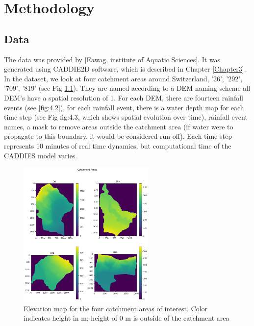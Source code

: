
\chapter{Methodology} %
\label{Chapter4} %

\section{Data}

The data was provided by [Eawag, institute of Aquatic Sciences]. It was generated using CADDIE2D software, which is described in Chapter \ref{Chapter3}. In the dataset, we look at four catchment areas around Switzerland, '26', '292', '709', '819' (see Fig \ref{fig:4.1}). They are named according to a DEM naming scheme all DEM's have a spatial resolution of 1. For each DEM, there are fourteen rainfall events (see \ref{fig:4.2}), for each rainfall event, there is a water depth  map for each time step (see Fig {fig:4.3}, which shows spatial evolution over time), rainfall event names, a mask to remove areas  outside the catchment area (if water were to propagate to this boundary, it would be considered run-off). Each time step represents 10 minutes of real time dynamics, but computational time of the CADDIES model varies.

\begin{figure}[htbp]
	\includegraphics[width=0.6\textwidth]{../Figures/Catchment_dems.png}
	\centering
	\caption[FourDems]{Elevation map for the four catchment areas of interest. Color indicates height in m; height of 0 m is outside of the catchment area} 
	\label{fig:4.1}
\end{figure}

